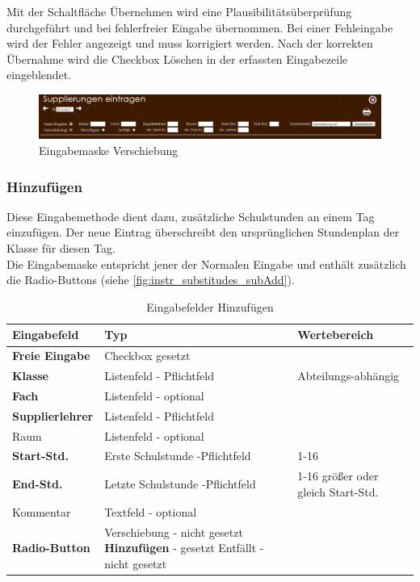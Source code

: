 Mit der Schaltfläche Übernehmen wird eine Plausibilitätsüberprüfung durchgeführt und bei fehlerfreier Eingabe übernommen. Bei einer Fehleingabe wird der Fehler angezeigt und muss korrigiert werden. Nach der korrekten Übernahme wird die Checkbox Löschen in der erfassten Eingabezeile eingeblendet.
\begin{figure}[H]
\centering
\includegraphics[keepaspectratio=true, width=17cm]{images/screenshots/substitudes_move.png}
\caption{Eingabemaske Verschiebung}
\label{fig:instr_substitudes_subMove}
\end{figure}
\subsubsection{Hinzufügen}\label{sec:instr_admin_sub_add}
Diese Eingabemethode dient dazu, zusätzliche Schulstunden an einem Tag einzufügen. Der neue Eintrag überschreibt den ursprünglichen Stundenplan der Klasse für diesen Tag.\\
Die Eingabemaske entspricht jener der Normalen Eingabe und enthält zusätzlich die Radio-Buttons (siehe \autoref{fig:instr_substitudes_subAdd}).
\begin{table}[H]
\centering
\begin{tabular}{p{3 cm}p{6 cm}p{5 cm}}
   \toprule
   \textbf{Eingabefeld} & \textbf{Typ} & \textbf{Wertebereich} \\
   \midrule
          \textbf{Freie Eingabe} & Checkbox \newline gesetzt & \\
          \hline
          \textbf{Klasse} & Listenfeld - Pflichtfeld & Abteilungs-abhängig \\
          \hline
          \textbf{Fach} & Listenfeld - optional & \\
          \hline
          \textbf{Supplierlehrer} & Listenfeld - Pflichtfeld & \\
          \hline
          Raum & Listenfeld - optional & \\
          \hline
          \textbf{Start-Std.} & Erste Schulstunde  -Pflichtfeld & 1-16 \\
		  \hline
          \textbf{End-Std.} & Letzte Schulstunde -Pflichtfeld & 1-16 \newline größer oder gleich Start-Std.\\
          \hline
          Kommentar & Textfeld - optional & \\
          \hline
          \textbf{Radio-Button} & Verschiebung - nicht gesetzt\newline 
          \textbf{Hinzufügen} - gesetzt \newline Entfällt - nicht gesetzt & \\
   \bottomrule
\end{tabular}
\caption{Eingabefelder Hinzufügen}
\end{table}
